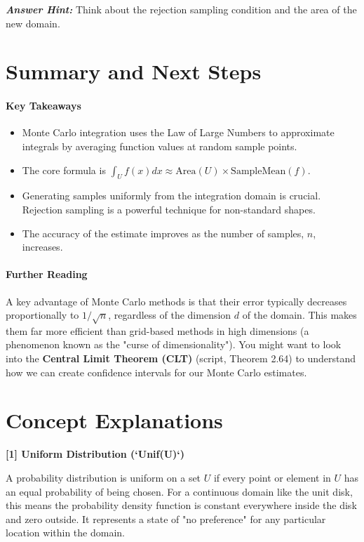 \documentclass[11pt,a4paper]{article}
\begin{document}
\textit{\textbf{Answer Hint:}} Think about the rejection sampling condition and the area of the new domain.

\section{Summary and Next Steps}

\paragraph{Key Takeaways}
\begin{itemize}
    \item Monte Carlo integration uses the Law of Large Numbers to approximate integrals by averaging function values at random sample points.
    \item The core formula is $\int_U f(x) dx \approx \text{Area}(U) \times \text{SampleMean}(f)$.
    \item Generating samples uniformly from the integration domain is crucial. Rejection sampling is a powerful technique for non-standard shapes.
    \item The accuracy of the estimate improves as the number of samples, $n$, increases.
\end{itemize}

\paragraph{Further Reading}
A key advantage of Monte Carlo methods is that their error typically decreases proportionally to $1/\sqrt{n}$, regardless of the dimension $d$ of the domain. This makes them far more efficient than grid-based methods in high dimensions (a phenomenon known as the "curse of dimensionality"). You might want to look into the \textbf{Central Limit Theorem (CLT)} (script, Theorem 2.64) to understand how we can create confidence intervals for our Monte Carlo estimates.

\newpage
\section*{Concept Explanations}

\hypertarget{unif}{\textbf{[1] Uniform Distribution (`Unif(U)`)}}
A probability distribution is uniform on a set $U$ if every point or element in $U$ has an equal probability of being chosen. For a continuous domain like the unit disk, this means the probability density function is constant everywhere inside the disk and zero outside. It represents a state of "no preference" for any particular location within the domain.
\vspace{1em}
\end{document}
